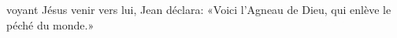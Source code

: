 \encetemps voyant Jésus venir vers lui, Jean déclara:
	«Voici l’Agneau de Dieu, qui enlève le péché du monde.»
